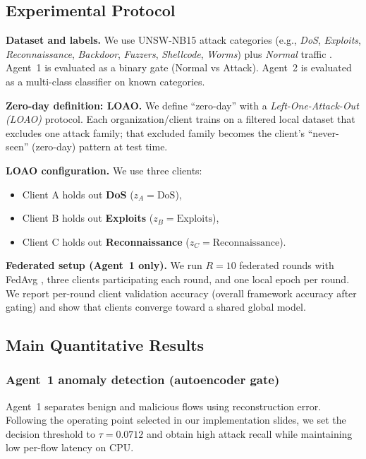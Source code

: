 \documentclass[conference]{IEEEtran}
\begin{document}
\subsection{Experimental Protocol}
\label{sec:protocol}

\textbf{Dataset and labels.} We use UNSW-NB15 attack categories (e.g., \emph{DoS}, \emph{Exploits}, \emph{Reconnaissance}, \emph{Backdoor}, \emph{Fuzzers}, \emph{Shellcode}, \emph{Worms}) plus \emph{Normal} traffic \cite{Moustafa2015UNSW}. Agent~1 is evaluated as a binary gate (Normal vs Attack). Agent~2 is evaluated as a multi-class classifier on known categories.

\textbf{Zero-day definition: LOAO.} We define ``zero-day'' with a \emph{Left-One-Attack-Out (LOAO)} protocol. Each organization/client trains on a filtered local dataset that excludes one attack family; that excluded family becomes the client’s ``never-seen'' (zero-day) pattern at test time.

\textbf{LOAO configuration.} We use three clients:
\begin{itemize}
  \item Client A holds out \textbf{DoS} ($z_A=\text{DoS}$),
  \item Client B holds out \textbf{Exploits} ($z_B=\text{Exploits}$),
  \item Client C holds out \textbf{Reconnaissance} ($z_C=\text{Reconnaissance}$).
\end{itemize}

\textbf{Federated setup (Agent~1 only).} We run $R=10$ federated rounds with FedAvg \cite{mcmahan2017fedavg}, three clients participating each round, and one local epoch per round. We report per-round client validation accuracy (overall framework accuracy after gating) and show that clients converge toward a shared global model.

\subsection{Main Quantitative Results}
\label{sec:main-results}

\subsubsection{Agent~1 anomaly detection (autoencoder gate)}
Agent~1 separates benign and malicious flows using reconstruction error. Following the operating point selected in our implementation slides, we set the decision threshold to $\tau=0.0712$ and obtain high attack recall while maintaining low per-flow latency on CPU.
\end{document}
